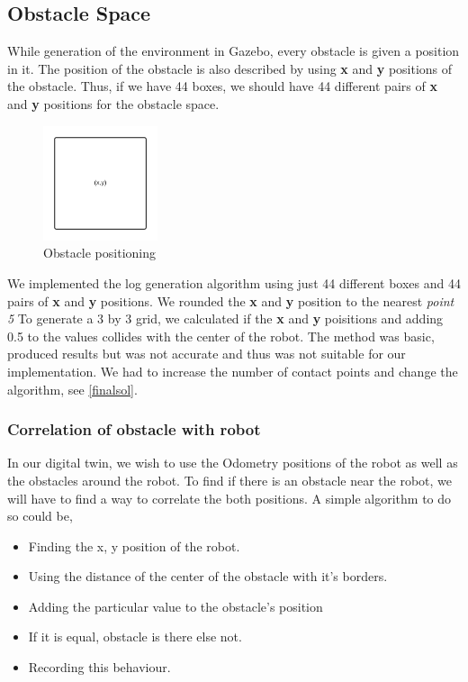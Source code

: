 \subsection{Obstacle Space}
While generation of the environment in Gazebo, every obstacle is given a position in it. The position of the obstacle is also described by 
using \textbf{x} and \textbf{y} positions of the obstacle. Thus, if we have 44 boxes, we should have 44 different pairs of \textbf{x} and \textbf{y} positions for the obstacle space.
\begin{figure}[th]
    \centering
    \includegraphics[width=0.3\textwidth]{Figures/simple-obstacle-x-y.png}
    \decoRule
    \caption[]{Obstacle positioning}
    \label{fig:ObstaclePositioning}
\end{figure}

We implemented the log generation algorithm using just 44 different boxes and 44 pairs of \textbf{x} and \textbf{y} positions. We rounded the \textbf{x} and \textbf{y} position to the nearest \textit{point 5}
To generate a 3 by 3 grid, we calculated if the \textbf{x} and \textbf{y} poisitions and adding 0.5 to the values collides with the center of the robot. The method was basic, produced results but was not accurate 
and thus was not suitable for our implementation. We had to increase the number of contact points and change the algorithm, see \ref{finalsol}.

\subsubsection{Correlation of obstacle with robot}
In our digital twin, we wish to use the Odometry positions of the robot as well as the obstacles around the robot. To find if there is an obstacle near the robot, we will have to find a way to correlate the both positions.
A simple algorithm to do so could be,
\begin{itemize}
    \item Finding the x, y position of the robot.
    \item Using the distance of the center of the obstacle with it's borders.
    \item Adding the particular value to the obstacle's position
    \item If it is equal, obstacle is there else not.
    \item Recording this behaviour.
\end{itemize}

